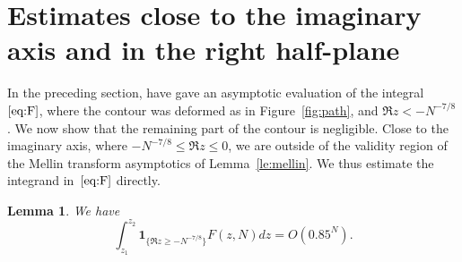 \documentclass[a4paper]{amsart}
\newtheorem{lemma}[theorem]{Lemma}
\begin{document}
\section{Estimates close to the imaginary axis and in the right
half-plane}\label{se:right}

In the preceding section, have gave an asymptotic evaluation of the
integral~$\ref{eq:F}$, where the contour was deformed as in 
Figure~\ref{fig:path}, and $\Re z < -N^{-7/8}$. We now show that
the remaining part of the contour is negligible.
Close to the imaginary axis, where $-N^{-7/8} \leq \Re z \leq 0$,
we are outside of the validity region of the Mellin transform asymptotics
of Lemma~\ref{le:mellin}. We thus estimate the integrand
in~$\ref{eq:F}$ directly.
%
\begin{lemma}\label{le:iR}
  We have
  \[
    \int_{z_1}^{z_2} \mathbf{1}_{\{\Re z \geq -N^{-7/8}\}}F(z,N) dz = O(0.85^N).
  \]
\end{lemma}
\end{document}
